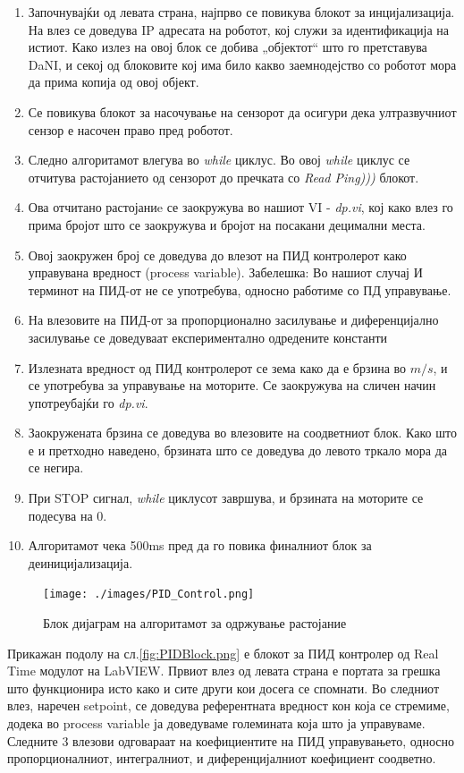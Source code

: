 \documentclass[11pt]{article}
\begin{document}
  \begin{enumerate}
    \item Започнувајќи од левата страна, најпрво се повикува блокот за инцијализација. На влез се доведува IP адресата на роботот, кој служи за идентификација на истиот. Како излез на овој блок се добива „објектот“ што го претставува DaNI, и секој од блоковите кој има било какво заемнодејство со роботот мора да прима копија од овој објект.
    \item Се повикува блокот за насочување на сензорот да осигури дека ултразвучниот сензор е насочен право пред роботот.
    \item Следно алгоритамот влегува во \textit{while} циклус. Во овој \textit{while} циклус се отчитува растојанието од сензорот до пречката со \textit{Read Ping)))} блокот.
    \item Ова отчитано растојаниe се заокружува во нашиот VI - \textit{dp.vi}, кој како влез го прима бројот што се заокружува и бројот на посакани децимални места.
    \item Овој заокружен број се доведува до влезот на ПИД контролерот како управувана вредност (process variable). Забелешка: Во нашиот случај И терминот на ПИД-от не се употребува, односно работиме со ПД управување.
    \item На влезовите на ПИД-от за пропорционално засилување и диференцијално засилување се доведуваат експериментално одредените константи
    \item Излезната вредност од ПИД контролерот се зема како да е брзина во $m/s$, и се употребува за управување на моторите. Се заокружува на сличен начин употреубајќи го \textit{dp.vi}.
    \item Заокружената брзина се доведува во влезовите на соодветниот блок. Како што е и претходно наведено, брзината што се доведува до левото тркало мора да се негира.
    \item При STOP сигнал, \textit{while} циклусот завршува, и брзината на моторите се подесува на 0.
    \item Алгоритамот чека 500ms пред да го повика финалниот блок за деиницијализација.
    \end{enumerate}

  \begin{figure}[H]
    \centering
    \texttt{[image: ./images/PID\_Control.png]}
    \caption{Блок дијаграм на алгоритамот за одржување растојание}
    \label{fig:PID_Control.png}
    \end{figure}

  Прикажан подолу на сл.\ref{fig:PIDBlock.png} е блокот за ПИД контролер од Real Time модулот на LabVIEW. Првиот влез од левата страна е портата за грешка што функционира исто како и сите други кои досега се спомнати. Во следниот влез, наречен setpoint, се доведува референтната вредност кон која се стремиме, додека во process variable ја доведуваме големината која што ја управуваме. Следните 3 влезови одговараат на коефициентите на ПИД управувањето, односно пропорционалниот, интегралниот, и диференцијалниот коефициент соодветно.
\end{document}
